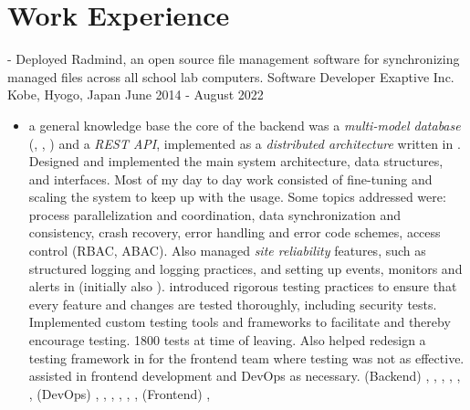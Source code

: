 \section{Work Experience}
- Deployed Radmind, an open source file management software for synchronizing managed files across all school lab computers.
\cventry
  {Software Developer} %
  {Exaptive Inc.} %
  {Kobe, Hyogo, Japan} %
  {June 2014 - August 2022} %
  {
    \begin{itemize} %
      \liststyle
      \item { a general knowledge base
          the core of the backend was a {\it multi-model database} (\rfmongodb, \rfneofj, \rfelastic) and a {\it REST API}, implemented as a {\it distributed architecture} written in \rfnodejs. 
          Designed and implemented the main system architecture, data structures, and interfaces. 
          Most of my day to day work consisted of fine-tuning and scaling the system to keep up with the usage.
          Some topics addressed were:
          process parallelization and coordination,
          data synchronization and consistency,
          crash recovery,
          error handling and error code schemes,
          access control (RBAC, ABAC).
          Also managed {\it site reliability} features, such as structured logging and logging practices, and setting up events, monitors and alerts in \rfnewrelic (initially also \rfsumologic).
         introduced rigorous testing practices to ensure that every feature and changes are tested thoroughly, including security tests. 
        Implemented custom testing tools and frameworks to facilitate and thereby encourage testing.
        1800 tests at time of leaving. 
        Also helped redesign a testing framework in \rfcypress for the frontend team where testing was not as effective.  
         assisted in frontend development and DevOps as necessary. 
        \tgskills (Backend) \rfnodejs, \rfmongodb, \rfneofj, \rfredis,  \rfbash, \rfdocker, 
        (DevOps) \rfaws, \rfterraform, \rfansible, \rfjenkins, \rfnewrelic, \rfsumologic,
        (Frontend) \rfreact, \rfcypress
      }
\end{itemize}}
